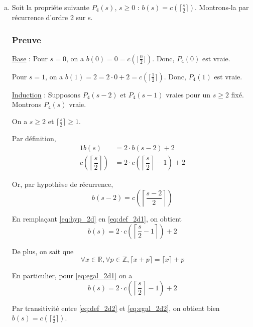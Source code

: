 \documentclass[12pt,a4paper]{article}
\begin{document}
\begin{enumerate}[a)]
\item Soit la propri\'ete suivante \( P_{4}(s) \), $s \geq 0$ : $b(s) = c(\lceil \frac{s}{2} \rceil)$.
Montrons-la par r\'ecurrence d'ordre 2 sur s.

\subsubsection*{Preuve}
\underline{Base} : Pour \( s = 0\), on a $b(0) = 0 = c(\lceil \frac{0}{2} \rceil)$. Donc, $P_{4}(0)$ est vraie.

Pour \( s = 1\), on a $b(1) = 2 = 2\cdot 0 + 2 = c(\lceil \frac{1}{2} \rceil)$. Donc, $P_{4}(1)$ est vraie.

\medskip
\underline{Induction} : Supposons \( P_{4}(s-2) \) et \( P_{4}(s-1) \) vraies pour un \( s \geq 2 \) fix\'e. Montrons \( P_{4}(s) \) vraie.

On a $s \geq 2$ et $\lceil \frac{s}{2} \rceil \geq 1$.

Par d\'efinition, 
\begin{alignat}{1}
    b(s) &= 2\cdot b(s-2) + 2 \label{eq:def_2d1} \\
    c\left(\left\lceil \dfrac{s}{2} \right\rceil\right) &= 2\cdot c\left(\left\lceil \dfrac{s}{2} \right\rceil - 1\right) + 2 \label{eq:def_2d2}
\end{alignat}

Or, par hypoth\`ese de r\'ecurrence, 
\begin{equation}
 b(s-2) = c\left(\left\lceil \dfrac{s-2}{2} \right\rceil\right) \label{eq:hyp_2d}
\end{equation}
 
En rempla\c{c}ant \eqref{eq:hyp_2d} en \eqref{eq:def_2d1}, on obtient 
\begin{equation}
 b(s) = 2\cdot c\left(\left\lceil \dfrac{s}{2} -1 \right\rceil\right)+2\label{eq:egal_2d1}
\end{equation}

De plus, on sait que
\begin{equation*}
 \forall x \in \mathbb{R}, \forall p \in \mathbb{Z}, \lceil x + p \rceil = \lceil x \rceil + p 
\end{equation*}

En particulier, pour \eqref{eq:egal_2d1} on a 
\begin{equation}
 b(s) = 2\cdot c\left(\left\lceil \dfrac{s}{2} \right\rceil -1\right)+2\label{eq:egal_2d2}
\end{equation}

Par transitivit\'e entre \eqref{eq:def_2d2} et \eqref{eq:egal_2d2}, on obtient bien $b(s) = c(\lceil \frac{s}{2}\rceil)$. 


\end{enumerate}
\end{document}
